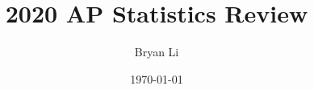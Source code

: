 \documentclass[a4paper,12pt]{book}
\title{2020 AP Statistics Review}
\author{Bryan Li}
\date{\today}
\theoremstyle{definition}
\begin{document}
\begingroup
  \let\newpage\relax%
  \maketitle
\endgroup
\large{\tableofcontents}



\end{document}

